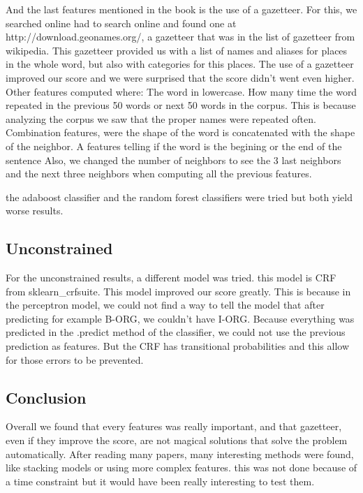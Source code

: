 \documentclass{article}
\begin{document}
And the last features mentioned in the book is the use of a gazetteer. For this, we searched online had to search online and found one at http://download.geonames.org/, a gazetteer that was in the list of gazetteer from wikipedia. This gazetteer provided us with a list of names and aliases for places in the whole word, but also with categories for this places. The use of a gazetteer improved our score and we were surprised that the score didn't went even higher. 
\newline
Other features computed where:\newline
The word in lowercase.\newline 
How many time the word repeated in the previous 50 words or next 50 words in the corpus. This is because analyzing the corpus we saw that the proper names were repeated often.\newline
Combination features, were the shape of the word is concatenated with the shape of the neighbor.\newline
A features telling if the word is the begining or the end of the sentence\newline
Also, we changed the number of neighbors to see the 3 last neighbors and the next three neighbors when computing all the previous features.\newline

the adaboost classifier and  the random forest classifiers were tried but both yield worse results.

\subsection{Unconstrained}
For the unconstrained results, a different model was tried. this model is CRF from sklearn\_crfsuite. This model improved our score greatly. This is because in the perceptron model, we could not find a way to tell the model that after predicting for example B-ORG, we couldn't have I-ORG. Because everything was predicted in the .predict method of the classifier, we could not use the previous prediction as features. But the CRF has transitional probabilities and this allow for those errors to be prevented.

\subsection{Conclusion}
Overall we found that every features was really important, and that gazetteer, even if they improve the score, are not magical solutions that solve the problem automatically. After reading many papers, many interesting methods were found, like stacking models or using more complex features. this was not done because of a time constraint but it would have been really interesting to test them. 
\end{document}
